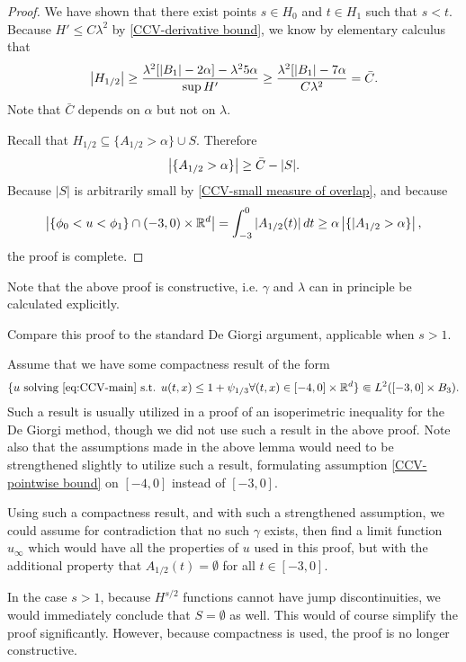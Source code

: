 \begin{proof}
We have shown that there exist points $s \in H_0$ and $t \in H_1$ such that $s < t$.  Because $H' \leq C \lambda^2$ by \eqref{CCV-derivative bound}, we know by elementary calculus that
\[ \left\lvert H_{1/2} \right\rvert \geq \frac{\lambda^2[|B_1|-2\alpha] - \lambda^2 5 \alpha }{\sup H'} \geq \frac{\lambda^2[|B_1| - 7\alpha }{C \lambda^2} = \bar{C}. \]
Note that $\bar{C}$ depends on $\alpha$ but not on $\lambda$.  

Recall that $H_{1/2} \subseteq \{A_{1/2} > \alpha \} \cup S$.  Therefore
\[ \left\lvert \{A_{1/2} > \alpha\} \right\rvert \geq \bar{C} - |S|. \]
Because $|S|$ is arbitrarily small by \eqref{CCV-small measure of overlap}, and because
\[ \left\lvert \{\phi_0 < u < \phi_1\} \cap (-3,0)\times \mathbb{R}^d \right\rvert = \int_{-3}^0 |A_{1/2}(t)| \,dt \geq \alpha \left\lvert \{|A_{1/2} > \alpha \} \right\rvert, \]
the proof is complete.  

\end{proof}








Note that the above proof is constructive, i.e. $\gamma$ and $\lambda$ can in principle be calculated explicitly.  

Compare this proof to the standard De Giorgi argument, applicable when $s > 1$.  

Assume that we have some compactness result of the form 
\[ \{u \textrm{ solving } \eqref{eq:CCV-main} \textrm{ s.t. } u(t,x) \leq 1 + \psi_{1/3} \forall (t,x) \in [-4,0]\times\mathbb{R}^d \} \Subset L^2([-3,0]\times B_3). \]
Such a result is usually utilized in a proof of an isoperimetric inequality for the De Giorgi method, though we did not use such a result in the above proof.  Note also that the assumptions made in the above lemma would need to be strengthened slightly to utilize such a result, formulating assumption \eqref{CCV-pointwise bound} on $[-4,0]$ instead of $[-3,0]$.  

Using such a compactness result, and with such a strengthened assumption, we could assume for contradiction that no such $\gamma$ exists, then find a limit function $u_\infty$ which would have all the properties of $u$ used in this proof, but with the additional property that $A_{1/2}(t) = \emptyset$ for all $t \in [-3,0]$.  

In the case $s > 1$, because $H^{s/2}$ functions cannot have jump discontinuities, we would immediately conclude that $S = \emptyset$ as well.  This would of course simplify the proof significantly.  However, because compactness is used, the proof is no longer constructive.  

